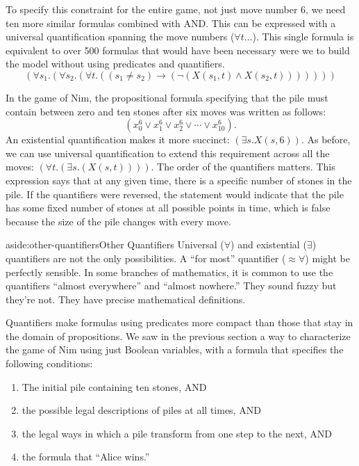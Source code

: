 {{To specify this constraint for the entire game, not just move number 6,
we need ten more similar formulas combined with AND.
This can be expressed with a universal quantification spanning the move numbers ($\forall t \dots$).
This single formula is equivalent to over 500 formulas that would
have been necessary were we to build the model
without using predicates and quantifiers.
$$(\forall s_1.(\forall s_2.(\forall t.((s_1 \ne s_2) \rightarrow (\neg(X(s_1, t) \wedge X(s_2, t)))))))$$

In the game of Nim, the propositional formula specifying that the pile must contain between zero and
ten stones after six moves was written as follows:
$$(x_{0}^{6} \vee x_{1}^{6} \vee x_{2}^{6} \vee \cdots \vee x_{10}^{6}).$$
An existential quantification makes it more succinct: $(\exists s.X(s, 6))$.
As before, we can use universal quantification to extend this requirement
across all the moves:
$(\forall t.(\exists s.(X(s, t))))$.
The order of the quantifiers matters. This expression says that at any given
time, there is a specific number of stones in the pile. If the quantifiers were reversed,
the statement would indicate that the pile has some fixed number of stones
at all possible points in time, which is false because the size of the pile
changes with every move.

\begin{aside}{aside:other-quantifiers}{Other Quantifiers}
Universal ($\forall$) and existential ($\exists$) quantifiers
are not the only possibilities.
A ``for most'' quantifier (${\approx}{\forall}$) might be perfectly sensible.
In some branches of mathematics, it is common to use the
quantifiers ``almost everywhere'' and ``almost nowhere.''
They sound fuzzy but they're not.
They have precise mathematical definitions.
\end{aside}

Quantifiers make formulas using predicates more compact than
those that stay in the domain of propositions.
We saw in the previous section a way
to characterize the game of Nim using just Boolean variables,
with a formula that specifies the following conditions:
\begin{enumerate}
\item The initial pile containing ten stones, AND
\item the possible legal descriptions of piles at all times, AND
\item the legal ways in which a pile transform from one step to the next, AND
\item the formula that ``Alice wins.''
\end{enumerate}

}}
